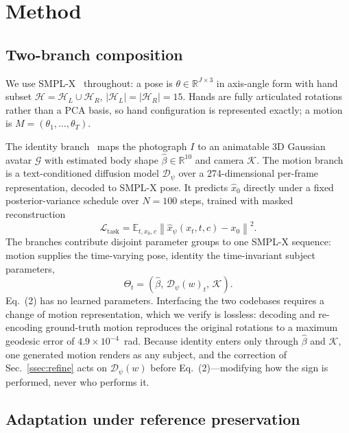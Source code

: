 \documentclass{article}
\begin{document}
\section{Method}
\label{sec:method}

\subsection{Two-branch composition}
\label{ssec:compose}

We use SMPL-X~\cite{pavlakos2019smplx} throughout: a pose is $\theta \in
\mathbb{R}^{J \times 3}$ in axis-angle form with hand subset $\mathcal{H} =
\mathcal{H}_L \cup \mathcal{H}_R$, $|\mathcal{H}_L| = |\mathcal{H}_R| = 15$.
Hands are fully articulated rotations rather than a PCA basis, so hand
configuration is represented exactly; a motion is $M = (\theta_1, \dots,
\theta_T)$.

The identity branch~\cite{qiu2025lhm} maps the photograph $I$ to an animatable 3D
Gaussian avatar $\mathcal{G}$ with estimated body shape $\hat{\beta} \in
\mathbb{R}^{10}$ and camera $\mathcal{K}$. The motion
branch~\cite{bensabath2026handmdm} is a text-conditioned diffusion model
$\mathcal{D}_{\psi}$ over a 274-dimensional per-frame representation, decoded to
SMPL-X pose. It predicts $\hat{x}_0$ directly under a fixed posterior-variance
schedule over $N = 100$ steps, trained with masked reconstruction
\begin{equation}
    \mathcal{L}_{\text{task}} = \mathbb{E}_{t, x_0, c}
    \left\| \hat{x}_{\psi}(x_t, t, c) - x_0 \right\|^2 .
\end{equation}
The branches contribute disjoint parameter groups to one SMPL-X sequence: motion
supplies the time-varying pose, identity the time-invariant subject parameters,
\begin{equation}
    \Theta_t = ( \hat{\beta},\, \mathcal{D}_{\psi}(w)_t,\, \mathcal{K} ).
\end{equation}
Eq.~(2) has no learned parameters. Interfacing the two codebases requires a
change of motion representation, which we verify is lossless: decoding and
re-encoding ground-truth motion reproduces the original rotations to a maximum
geodesic error of $4.9 \times 10^{-4}$~rad. Because identity enters only through
$\hat{\beta}$ and $\mathcal{K}$, one generated motion renders as any subject, and
the correction of Sec.~\ref{ssec:refine} acts on $\mathcal{D}_{\psi}(w)$ before
Eq.~(2)---modifying how the sign is performed, never who performs it.

\subsection{Adaptation under reference preservation}
\label{ssec:adapt}
\end{document}
